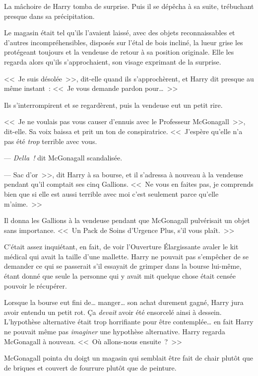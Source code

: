 La mâchoire de Harry tomba de surprise. Puis il se dépêcha à sa suite, trébuchant presque dans sa précipitation.

\later

Le magasin était tel qu'ils l'avaient laissé, avec des objets reconnaissables et d'autres incompréhensibles, disposés sur l'étal de bois incliné, la lueur grise les protégeant toujours et la vendeuse de retour à sa position originale. Elle les regarda alors qu'ils s'approchaient, son visage exprimant de la surprise.

<<~Je suis désolée~>>, dit-elle quand ils s'approchèrent, et Harry dit presque au même instant~: <<~Je vous demande pardon pour…~>>

Ils s'interrompirent et se regardèrent, puis la vendeuse eut un petit rire. 

<<~Je ne voulais pas vous causer d'ennuis avec le Professeur McGonagall~>>, dit-elle. Sa voix baissa et prit un ton de conspiratrice. <<~J'espère qu'elle n'a pas été \emph{trop} terrible avec vous.

--- \emph{Della~!} dit McGonagall scandalisée.

--- Sac d'or~>>, dit Harry à sa bourse, et il s'adressa à nouveau à la vendeuse pendant qu'il comptait ses cinq Gallions. <<~Ne vous en faites pas, je comprends bien que si elle est aussi terrible avec moi c'est seulement parce qu'elle m'aime.~>>

Il donna les Gallions à la vendeuse pendant que McGonagall pulvérisait un objet sans importance. <<~Un Pack de Soins d'Urgence Plus, s'il vous plaît.~>>

C'était assez inquiétant, en fait, de voir l'Ouverture Élargissante avaler le kit médical qui avait la taille d'une mallette. Harry ne pouvait pas s'empêcher de se demander ce qui se passerait s'il essayait de grimper dans la bourse lui-même, étant donné que seule la personne qui y avait mit quelque chose était censée pouvoir le récupérer.

Lorsque la bourse eut fini de… manger… son achat durement gagné, Harry jura avoir entendu un petit rot. Ça \emph{devait} avoir été ensorcelé ainsi à dessein. L'hypothèse alternative était trop horrifiante pour être contemplée… en fait Harry ne pouvait même pas \emph{imaginer} une hypothèse alternative. Harry regarda McGonagall à nouveau. <<~Où allons-nous ensuite~?~>>

McGonagall pointa du doigt un magasin qui semblait être fait de chair plutôt que de briques et couvert de fourrure plutôt que de peinture. 

